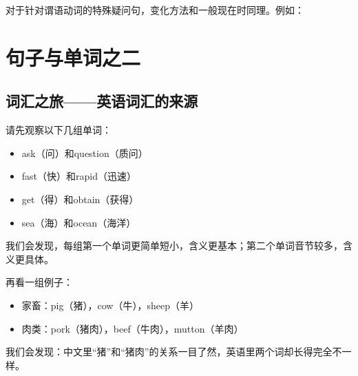 \documentclass[10.5pt, a4paper]{ctexbook} %
\begin{document}
对于针对谓语动词的特殊疑问句，变化方法和一般现在时同理。例如：

\begin{liju}
\end{liju}

\chapter{句子与单词之二}

\section{词汇之旅——英语词汇的来源}

请先观察以下几组单词：
\begin{center}
    \begin{minipage}{0.6\linewidth}
    \centering
        \begin{itemize}
            \item ask（问）和question（质问）
            \item fast（快）和rapid（迅速）
            \item get（得）和obtain（获得）
            \item sea（海）和ocean（海洋）
        \end{itemize}
    \end{minipage}
\end{center}

我们会发现，每组第一个单词更简单短小，含义更基本；第二个单词音节较多，含义更具体。

再看一组例子：
\begin{center}
    \begin{minipage}{0.6\linewidth}
    \centering
        \begin{itemize}
            \item 家畜：pig\phantom{k}（猪），\phantom{肉}cow（牛），\phantom{肉}sheep\phantom{jj}（羊）
            \item 肉类：pork（猪肉），beef（牛肉），mutton（羊肉）
        \end{itemize}
    \end{minipage}
\end{center}

我们会发现：中文里“猪”和“猪肉”的关系一目了然，英语里两个词却长得完全不一样。
\end{document}
